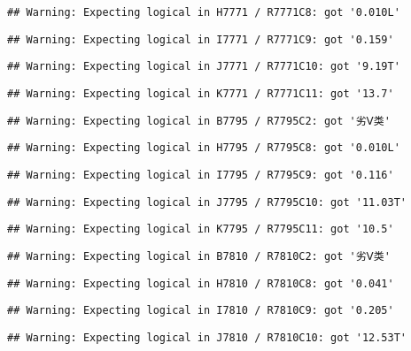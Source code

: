 \documentclass[
]{article}
\begin{document}
\begin{verbatim}
## Warning: Expecting logical in H7771 / R7771C8: got '0.010L'
\end{verbatim}

\begin{verbatim}
## Warning: Expecting logical in I7771 / R7771C9: got '0.159'
\end{verbatim}

\begin{verbatim}
## Warning: Expecting logical in J7771 / R7771C10: got '9.19T'
\end{verbatim}

\begin{verbatim}
## Warning: Expecting logical in K7771 / R7771C11: got '13.7'
\end{verbatim}

\begin{verbatim}
## Warning: Expecting logical in B7795 / R7795C2: got '劣Ⅴ类'
\end{verbatim}

\begin{verbatim}
## Warning: Expecting logical in H7795 / R7795C8: got '0.010L'
\end{verbatim}

\begin{verbatim}
## Warning: Expecting logical in I7795 / R7795C9: got '0.116'
\end{verbatim}

\begin{verbatim}
## Warning: Expecting logical in J7795 / R7795C10: got '11.03T'
\end{verbatim}

\begin{verbatim}
## Warning: Expecting logical in K7795 / R7795C11: got '10.5'
\end{verbatim}

\begin{verbatim}
## Warning: Expecting logical in B7810 / R7810C2: got '劣Ⅴ类'
\end{verbatim}

\begin{verbatim}
## Warning: Expecting logical in H7810 / R7810C8: got '0.041'
\end{verbatim}

\begin{verbatim}
## Warning: Expecting logical in I7810 / R7810C9: got '0.205'
\end{verbatim}

\begin{verbatim}
## Warning: Expecting logical in J7810 / R7810C10: got '12.53T'
\end{verbatim}
\end{document}
